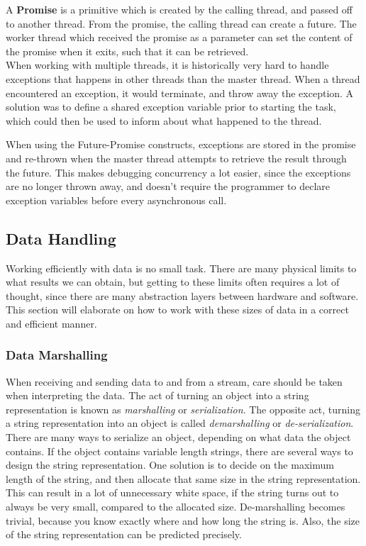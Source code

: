 \documentclass[a4paper]{article}
\begin{document}
A \textbf{Promise} is a primitive which is created by the calling thread, and passed off to another thread. From the promise, the calling thread can create a future. The worker thread which received the promise as a parameter can set the content of the promise when it exits, such that it can be retrieved.\\

When working with multiple threads, it is historically very hard to handle exceptions that happens in other threads than the master thread. When a thread encountered an exception, it would terminate, and throw away the exception. A solution was to define a shared exception variable prior to starting the task, which could then be used to inform about what happened to the thread. 

When using the Future-Promise constructs, exceptions are stored in the promise and re-thrown when the master thread attempts to retrieve the result through the future. This makes debugging concurrency a lot easier, since the exceptions are no longer thrown away, and doesn't require the programmer to declare exception variables before every asynchronous call.


\newpage
\subsection{Data Handling}
Working efficiently with data is no small task. There are many physical limits to what results we can obtain, but getting to these limits often requires a lot of thought, since there are many abstraction layers between hardware and software. This section will elaborate on how to work with these sizes of data in a correct and efficient manner.


\subsubsection{Data Marshalling}
When receiving and sending data to and from a stream, care should be taken when interpreting the data. The act of turning an object into a string representation is known as \textit{marshalling} or \textit{serialization}. The opposite act, turning a string representation into an object is called \textit{demarshalling} or \textit{de-serialization}.\\

There are many ways to serialize an object, depending on what data the object contains. If the object contains variable length strings, there are several ways to design the string representation. One solution is to decide on the maximum length of the string, and then allocate that same size in the string representation. This can result in a lot of unnecessary white space, if the string turns out to always be very small, compared to the allocated size. De-marshalling becomes trivial, because you know exactly where and how long the string is. Also, the size of the string representation can be predicted precisely.\\
\end{document}
